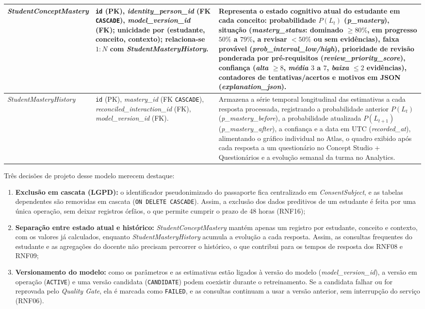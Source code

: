 {\begin{longtable}{>{\raggedright\arraybackslash}p{3.4cm}>{\raggedright\arraybackslash}p{4.2cm}>{\raggedright\arraybackslash}p{6.2cm}}
\hline
\textit{StudentConcept\allowbreak Mastery} & \texttt{id} (PK), \textit{identity\_person\_id} (FK \texttt{CASCADE}), \textit{model\_version\_id} (FK); unicidade por (estudante, conceito, contexto); relaciona-se $1:N$ com \textit{StudentMasteryHistory}. & Representa o estado cognitivo atual do estudante em cada conceito: probabilidade $P(L_t)$ (\textit{p\_mastery}), situação (\textit{mastery\_status}: dominado $\ge 80\%$, em progresso $50\%$ a $79\%$, a revisar $< 50\%$ ou sem evidências), faixa provável (\textit{prob\_interval\_low/high}), prioridade de revisão ponderada por pré-requisitos (\textit{review\_priority\_score}), confiança (\textit{alta} $\ge 8$, \textit{média} $3$ a $7$, \textit{baixa} $\le 2$ evidências), contadores de tentativas/acertos e motivos em JSON (\textit{explanation\_json}). \\
\hline
\textit{StudentMastery\allowbreak History} & \texttt{id} (PK), \textit{mastery\_id} (FK \texttt{CASCADE}), \textit{reconciled\_interaction\_id} (FK), \textit{model\_version\_id} (FK). & Armazena a série temporal longitudinal das estimativas a cada resposta processada, registrando a probabilidade anterior $P(L_t)$ (\textit{p\_mastery\_before}), a probabilidade atualizada $P(L_{t+1})$ (\textit{p\_mastery\_after}), a confiança e a data em UTC (\textit{recorded\_at}), alimentando o gráfico individual no Atlas, o quadro exibido após cada resposta a um questionário no Concept Studio + Questionários e a evolução semanal da turma no Analytics. \\
\hline
\end{longtable}
}

Três decisões de projeto desse modelo merecem destaque:
\begin{enumerate}
    \item \textbf{Exclusão em cascata (LGPD):} o identificador pseudonimizado do passaporte fica centralizado em \textit{ConsentSubject}, e as tabelas dependentes são removidas em cascata (\texttt{ON DELETE CASCADE}). Assim, a exclusão dos dados preditivos de um estudante é feita por uma única operação, sem deixar registros órfãos, o que permite cumprir o prazo de 48 horas (RNF16);
    \item \textbf{Separação entre estado atual e histórico:} \textit{StudentConceptMastery} mantém apenas um registro por estudante, conceito e contexto, com os valores já calculados, enquanto \textit{StudentMasteryHistory} acumula a evolução a cada resposta. Assim, as consultas frequentes do estudante e as agregações do docente não precisam percorrer o histórico, o que contribui para os tempos de resposta dos RNF08 e RNF09;
    \item \textbf{Versionamento do modelo:} como os parâmetros e as estimativas estão ligados à versão do modelo (\textit{model\_version\_id}), a versão em operação (\texttt{ACTIVE}) e uma versão candidata (\texttt{CANDIDATE}) podem coexistir durante o retreinamento. Se a candidata falhar ou for reprovada pelo \textit{Quality Gate}, ela é marcada como \texttt{FAILED}, e as consultas continuam a usar a versão anterior, sem interrupção do serviço (RNF06).
\end{enumerate}


